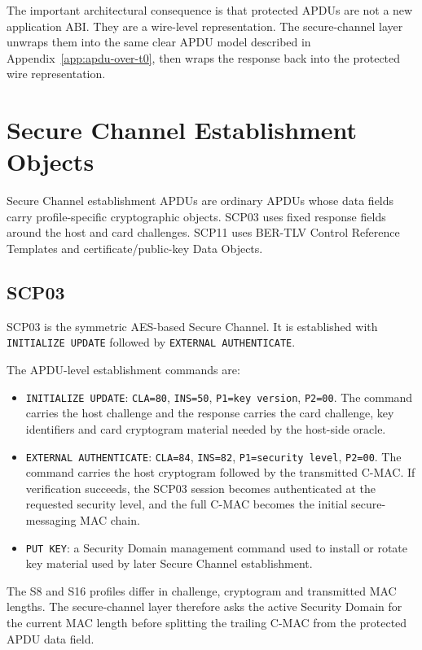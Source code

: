 The important architectural consequence is that protected APDUs are not a new
application ABI. They are a wire-level representation. The secure-channel layer
unwraps them into the same clear APDU model described in
Appendix~\ref{app:apdu-over-t0}, then wraps the response back into the protected
wire representation.

\section{Secure Channel Establishment Objects}

Secure Channel establishment APDUs are ordinary APDUs whose data fields carry
profile-specific cryptographic objects. SCP03 uses fixed response fields around
the host and card challenges. SCP11 uses BER-TLV Control Reference Templates
and certificate/public-key Data Objects.

\subsection{SCP03}

SCP03 is the symmetric AES-based Secure Channel. It is established with
\texttt{INITIALIZE UPDATE} followed by \texttt{EXTERNAL AUTHENTICATE}.

The APDU-level establishment commands are:
\begin{itemize}
\item \texttt{INITIALIZE UPDATE}:
      \texttt{CLA=80}, \texttt{INS=50}, \texttt{P1=key version},
      \texttt{P2=00}. The command carries the host challenge and
      the response carries the card challenge, key identifiers and card
      cryptogram material needed by the host-side oracle.
\item \texttt{EXTERNAL AUTHENTICATE}:
      \texttt{CLA=84}, \texttt{INS=82}, \texttt{P1=security level},
      \texttt{P2=00}. The command carries the host cryptogram followed by the
      transmitted C-MAC. If verification succeeds, the SCP03 session becomes
      authenticated at the requested security level, and the full C-MAC becomes
      the initial secure-messaging MAC chain.
\item \texttt{PUT KEY}: a Security Domain management command used to install
      or rotate key material used by later Secure Channel establishment.
\end{itemize}

The S8 and S16 profiles differ in challenge, cryptogram and transmitted MAC
lengths. The secure-channel layer therefore asks the active Security Domain
for the current MAC length before splitting the trailing C-MAC from the
protected APDU data field.

